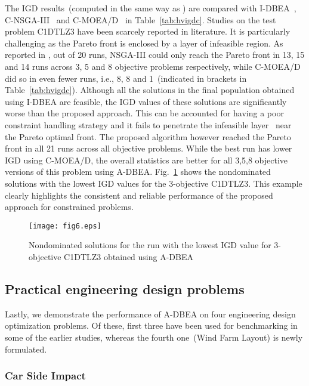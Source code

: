 The IGD results~(computed in the same way as \cite{Li2015dominance}) are compared with I-DBEA~\cite{Asafmany2015}, C-NSGA-III~\cite{Deb2014adaptive} and C-MOEA/D~\cite{Deb2014adaptive} in Table~\ref{tab:hvigdc}. Studies on the test problem C1DTLZ3 have been scarcely reported in literature. It is particularly challenging as the Pareto front is enclosed by a layer of infeasible region. As reported in \cite{Deb2014adaptive}, out of 20 runs, NSGA-III could only reach the Pareto front in 13, 15 and 14 runs across 3, 5 and 8 objective problems respectively, while C-MOEA/D did so in even fewer runs, i.e., 8, 8 and 1~(indicated in brackets in Table~\ref{tab:hvigdc}). Although all the solutions in the final population obtained using I-DBEA are feasible, the IGD values of these solutions are significantly worse than the proposed approach. This can be accounted for having a poor constraint handling strategy and it fails to penetrate the infeasible layer~\cite{Deb2014adaptive} near the Pareto optimal front. The proposed algorithm however reached the Pareto front in all 21 runs across all objective problems. While the best run has lower IGD using C-MOEA/D, the overall statistics are better for all 3,5,8 objective versions of this problem using A-DBEA. Fig.~\ref{fig:frontc} shows the nondominated solutions with the lowest IGD values for the 3-objective C1DTLZ3. This example clearly highlights the consistent and reliable performance of the proposed approach for constrained problems.

\begin{figure}[!htb]
	\centering
	\texttt{[image: fig6.eps]}
	\caption{Nondominated solutions for the run with the lowest IGD value for 3-objective C1DTLZ3 obtained using A-DBEA}
	\label{fig:frontc}
\end{figure}		

\subsection{Practical engineering design problems}

Lastly, we demonstrate the performance of A-DBEA on four engineering design optimization problems. Of these, first three have been used for benchmarking in some of the earlier studies, whereas the fourth one~(Wind Farm Layout) is newly formulated.  

\subsubsection{Car Side Impact}

